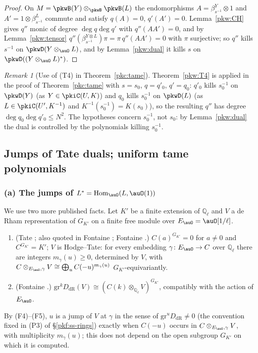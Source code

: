 \documentclass[10pt]{amsart}
\theoremstyle{definition}
\theoremstyle{remark}
\newtheorem{remark}[theorem]{Remark}
\newcommand{\Q}{\mathbb Q}
\begin{document}
\begin{proof}
On $M=\pkwB(Y)\otimes_{\pkwB}\pkwB(L)$ the endomorphisms $A=\beta^Y_{s^{-1}}\otimes1$ and $A'=1\otimes
\beta^L_{s^{-1}}$ commute and satisfy $q(A)=0$, $q'(A')=0$. Lemma~\ref{pkw:CH} gives $q''$ monic of degree
$\deg q\deg q'$ with $q''(AA')=0$, and by Lemma~\ref{pkw:tensor}
$q''(\beta^{Y\otimes L}_{s^{-1}})\pi=\pi\,q''(AA')=0$ with $\pi$ surjective; so $q''$ kills $s^{-1}$ on
$\pkwD(Y\otimes_\auO L)$, and by Lemma~\ref{pkw:dual} it kills $s$ on $\pkwD((Y\otimes_\auO L)^*)$.
\end{proof}

\begin{remark}[Use of (T4) in Theorem~\ref{pkc:tame}]\label{pkw:rem-T4}
Theorem~\ref{pkw:T4} is applied in the proof of Theorem~\ref{pkc:tame} with $s=s_0$, $q=q'_0$, $q'=q_0$: $q'_0$
kills $s_0^{-1}$ on $\pkwD(Y)$ (as $Y\in\pkiC(U,K)$) and $q_0$ kills $s_0^{-1}$ on $\pkwD(L)$ (as
$L\in\pkiC(U',K^{-1})$ and $K^{-1}(s_0^{-1})=K(s_0)$), so the resulting $q''$ has degree
$\deg q_0\deg q'_0\le N^2$. The hypotheses concern $s_0^{-1}$, not $s_0$: by Lemma~\ref{pkw:dual} the dual is
controlled by the polynomials killing $s_0^{-1}$.
\end{remark}

\subsection{Jumps of Tate duals; uniform tame polynomials}\label{pkw:ss-checks}

\subsubsection*{(a) The jumps of $L^*=\operatorname{Hom}_\auO(L,\auO(1))$}

We use two more published facts. Let $K'$ be a finite extension of $\Q_\ell$ and $V$ a de Rham representation of
$G_{K'}$ on a finite free module over $E_\auO=\auO[1/\ell]$.
\begin{enumerate}
\item[(F4)] (Tate \cite[\S3, Theorems~1 and~2, p.~176]{pklTate67}; also quoted in Fontaine \cite[1.5.7]{pkfFontaineII}; Fontaine \cite[3.8]{pkfFontaineIII}.) $C(a)^{G_{K'}}=0$ for $a\ne0$ and
$C^{G_{K'}}=K'$; $V$ is Hodge--Tate: for every embedding $\gamma\colon E_\auO\to C$ over $\Q_\ell$ there are integers
$m_\gamma(u)\ge0$, determined by $V$, with $C\otimes_{E_\auO,\gamma}V\cong\bigoplus_uC(-u)^{m_\gamma(u)}$
$G_{K'}$-equivariantly.
\item[(F5)] (Fontaine \cite[3.7--3.8]{pkfFontaineIII}.) $\mathrm{gr}^kD_{\mathrm{dR}}(V)\cong
(C(k)\otimes_{\Q_\ell}V)^{G_{K'}}$, compatibly with the action of $E_\auO$.
\end{enumerate}
By (F4)--(F5), $u$ is a jump of $V$ at $\gamma$ in the sense of $\mathrm{gr}^uD_{\mathrm{dR}}\ne0$ (the convention
fixed in (P3) of \S\ref{pkf:ss-rings}) exactly when $C(-u)$ occurs in $C\otimes_{E_\auO,\gamma}V$, with multiplicity
$m_\gamma(u)$; this does not depend on the open subgroup $G_{K'}$ on which it is computed.
\end{document}
